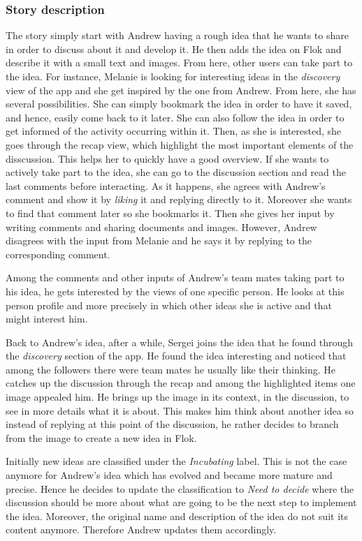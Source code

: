 \documentclass[a4paper,12pt,twoside]{article}
\begin{document}
\subsubsection*{Story description}
The story simply start with Andrew having a rough idea that he wants to share in order to discuss about it and develop it.
He then adds the idea on Flok and describe it with a small text and images.
From here, other users can take part to the idea. For instance, Melanie is looking for interesting ideas in the \emph{discovery} view of the app and she get inspired by the one from Andrew.
From here, she has several possibilities.
She can simply bookmark the idea in order to have it saved, and hence, easily come back to it later.
She can also follow the idea in order to get informed of the activity occurring within it.
Then, as she is interested, she goes through the recap view, which highlight the most important elements of the disscussion.
This helps her to quickly have a good overview.
If she wants to actively take part to the idea, she can go to the discussion section and read the last comments before interacting.
As it happens, she agrees with Andrew's comment and show it by \emph{liking} it and replying directly to it.
Moreover she wants to find that comment later so she bookmarks it.
Then she gives her input by writing comments and sharing documents and images.
However, Andrew disagrees with the input from Melanie and he says it by replying to the corresponding comment.

Among the comments and other inputs of Andrew's team mates taking part to his idea, he gets interested by the views of one specific person.
He looks at this person profile and more precisely in which other ideas she is active and that might interest him.

Back to Andrew's idea, after a while, Sergei joins the idea that he found through the \emph{discovery} section of the app.
He found the idea interesting and noticed that among the followers there were team mates he usually like their thinking.
He catches up the discussion through the recap and among the highlighted items one image appealed him.
He brings up the image in its context, in the discussion, to see in more details what it is about.
This makes him think about another idea so instead of replying at this point of the discussion, he rather decides to branch from the image to create a new idea in Flok.

Initially new ideas are classified under the \emph{Incubating} label.
This is not the case anymore for Andrew's idea which has evolved and became more mature and precise.
Hence he decides to update the classification to \emph{Need to decide} where the discussion should be more about what are going to be the next step to implement the idea.
Moreover, the original name and description of the idea do not suit its content anymore.
Therefore Andrew updates them accordingly.
\end{document}
